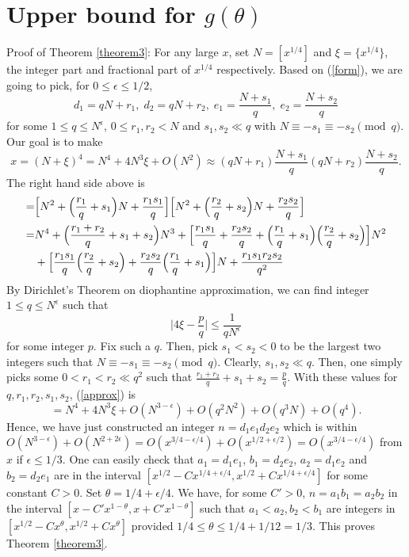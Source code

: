 \documentclass{article}
\begin{document}
\section{Upper bound for $g(\theta)$}
Proof of Theorem \ref{theorem3}: For any large $x$, set $N = [x^{1/4}]$ and $\xi = \{x^{1/4}\}$, the integer part and fractional part of $x^{1/4}$ respectively. Based on (\ref{form}), we are going to pick, for $0 \leq \epsilon \leq 1/2$,
\begin{equation}
\label{de}
d_1 = q N + r_1, \; d_2 = q N + r_2, \; e_1 = \frac{N + s_1}{q}, \; e_2 = \frac{N + s_2}{q}
\end{equation}
for some $1 \leq q \leq N^\epsilon$, $0 \leq r_1, r_2 < N$ and $s_1, s_2 \ll q$ with $N \equiv -s_1 \equiv -s_2 \pmod q$. Our goal is to make
$$x = (N+\xi)^4 = N^4 + 4N^3 \xi + O(N^2) \approx (qN+r_1) \frac{N + s_1}{q} (qN+r_2) \frac{N + s_2}{q}.$$
The right hand side above is
\begin{equation}
\label{approx}
\begin{split}
=& \Bigl[N^2 + \Bigl(\frac{r_1}{q} + s_1\Bigr)N + \frac{r_1 s_1}{q} \Bigr] \Bigl[N^2 + \Bigl(\frac{r_2}{q} + s_2\Bigr)N + \frac{r_2 s_2}{q} \Bigr] \\
=& N^4 + \Bigl(\frac{r_1 + r_2}{q} + s_1 + s_2 \Bigr)N^3 + \Bigl[\frac{r_1 s_1}{q} + \frac{r_2 s_2}{q} + \Bigl(\frac{r_1}{q} + s_1\Bigr) \Bigl(\frac{r_2}{q} + s_2\Bigr) \Bigr] N^2 \\
&+ \Bigl[\frac{r_1 s_1}{q} \Bigl(\frac{r_2}{q} + s_2\Bigr) + \frac{r_2 s_2}{q} \Bigl(\frac{r_1}{q} + s_1\Bigr)\Bigr] N + \frac{r_1 s_1 r_2 s_2}{q^2}
\end{split}
\end{equation}
By Dirichlet's Theorem on diophantine approximation, we can find integer $1 \leq q \leq N^\epsilon$ such that
$$\Big| 4\xi - \frac{p}{q} \Big| \leq \frac{1}{q N^\epsilon}$$
for some integer $p$. Fix such a $q$. Then, pick $s_1 < s_2 < 0$ to be the largest two integers such that $N \equiv -s_1 \equiv -s_2 \pmod q$. Clearly, $s_1, s_2 \ll q$. Then, one simply picks some $0 < r_1 < r_2 \ll q^2$ such that $\frac{r_1 + r_2}{q} + s_1 + s_2 = \frac{p}{q}$. With these values for $q, r_1, r_2, s_1, s_2$, (\ref{approx}) is
$$=N^4 + 4N^3 \xi + O(N^{3-\epsilon}) + O(q^2 N^2) + O(q^3 N) + O(q^4).$$
Hence, we have just constructed an integer $n = d_1 e_1 d_2 e_2$ which is within $O(N^{3-\epsilon}) + O(N^{2+2\epsilon}) = O(x^{3/4 - \epsilon/4}) + O(x^{1/2 + \epsilon/2}) = O(x^{3/4 - \epsilon/4})$ from $x$ if $\epsilon \leq 1/3$. One can easily check that $a_1 = d_1 e_1$, $b_1 = d_2 e_2$, $a_2 = d_1 e_2$ and $b_2 = d_2 e_1$ are in the interval $[x^{1/2} - C x^{1/4 + \epsilon/4}, x^{1/2} + C x^{1/4 + \epsilon/4}]$ for some constant $C > 0$. Set $\theta = 1/4 + \epsilon/4$. We have, for some $C' > 0$, $n = a_1 b_1 = a_2 b_2$ in the interval $[x - C'x^{1 - \theta}, x+C'x^{1 - \theta}]$ such that $a_1 < a_2, b_2 < b_1$ are integers in $[x^{1/2} - Cx^\theta, x^{1/2} + Cx^\theta]$ provided $1/4 \leq \theta \leq 1/4 + 1/12 = 1/3$. This proves Theorem \ref{theorem3}.
\end{document}
